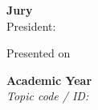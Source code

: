 \begin{titlepage}
\vspace{0.9cm}
{\small\bfseries Jury}\\[6pt]
{\normalsize President:} \quad \jurypresident\\[5pt]

\vfill

{\footnotesize Presented on }

\vspace{0.45cm}
\begin{flushright}
{\normalsize\bfseries Academic Year \academicyear}\\[5pt]
{\footnotesize\itshape Topic code / ID: \topiccode}
\end{flushright}

\restoregeometry
\end{titlepage}
